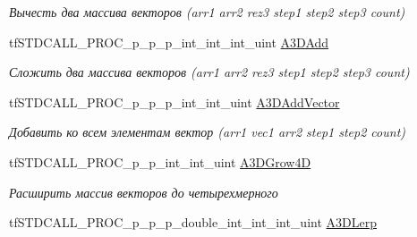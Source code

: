 \begin{DoxyCompactItemize}
\begin{DoxyCompactList}\small\item\em Вычесть два массива векторов (arr1 arr2 rez3 step1 step2 step3 count) \end{DoxyCompactList}\item 
\hypertarget{structs_functions_array_vector_c_p_u_a71b50279296b7e291b222aa862d2d1d6}{tf\-S\-T\-D\-C\-A\-L\-L\-\_\-\-P\-R\-O\-C\-\_\-p\-\_\-p\-\_\-p\-\_\-int\-\_\-int\-\_\-int\-\_\-uint \hyperlink{structs_functions_array_vector_c_p_u_a71b50279296b7e291b222aa862d2d1d6}{A3\-D\-Add}}\label{structs_functions_array_vector_c_p_u_a71b50279296b7e291b222aa862d2d1d6}

\begin{DoxyCompactList}\small\item\em Сложить два массива векторов (arr1 arr2 rez3 step1 step2 step3 count) \end{DoxyCompactList}\item 
\hypertarget{structs_functions_array_vector_c_p_u_a0da1a196045f4542b94ea38e8cb57863}{tf\-S\-T\-D\-C\-A\-L\-L\-\_\-\-P\-R\-O\-C\-\_\-p\-\_\-p\-\_\-p\-\_\-int\-\_\-int\-\_\-uint \hyperlink{structs_functions_array_vector_c_p_u_a0da1a196045f4542b94ea38e8cb57863}{A3\-D\-Add\-Vector}}\label{structs_functions_array_vector_c_p_u_a0da1a196045f4542b94ea38e8cb57863}

\begin{DoxyCompactList}\small\item\em Добавить ко всем элементам вектор (arr1 vec1 arr2 step1 step2 count) \end{DoxyCompactList}\item 
\hypertarget{structs_functions_array_vector_c_p_u_a5f37c82b7fa8e7d9c1f07369fcd0abbf}{tf\-S\-T\-D\-C\-A\-L\-L\-\_\-\-P\-R\-O\-C\-\_\-p\-\_\-p\-\_\-int\-\_\-int\-\_\-uint \hyperlink{structs_functions_array_vector_c_p_u_a5f37c82b7fa8e7d9c1f07369fcd0abbf}{A3\-D\-Grow4\-D}}\label{structs_functions_array_vector_c_p_u_a5f37c82b7fa8e7d9c1f07369fcd0abbf}

\begin{DoxyCompactList}\small\item\em Расширить массив векторов до четырехмерного \end{DoxyCompactList}\item 
\hypertarget{structs_functions_array_vector_c_p_u_a83133411d2dcc647346e75fa4ddfc258}{tf\-S\-T\-D\-C\-A\-L\-L\-\_\-\-P\-R\-O\-C\-\_\-p\-\_\-p\-\_\-p\-\_\-double\-\_\-int\-\_\-int\-\_\-int\-\_\-uint \hyperlink{structs_functions_array_vector_c_p_u_a83133411d2dcc647346e75fa4ddfc258}{A3\-D\-Lerp}}\label{structs_functions_array_vector_c_p_u_a83133411d2dcc647346e75fa4ddfc258}


\end{DoxyCompactItemize}
